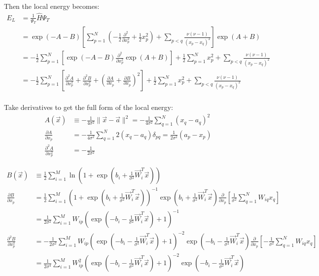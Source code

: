 \documentclass[12pt]{article}
\begin{document}
\noindent Then the local energy becomes:
\begin{align*}
E_L &= \frac{1}{\Psi_T} \hat{H} \Psi_T\\
&= \exp (-A-B)
\left[ \sum_{p=1}^{N} \left( -\frac{1}{2} \frac{\partial^2}{\partial x_p^2} + \frac{1}{2} x_p^2 \right) + \sum_{p<q} \frac{\nu (\nu -1)}{(x_p-x_q)^2} \right]
\exp (A+B)\\
&= -\frac{1}{2} \sum_{p=1}^{N} \left[ \exp (-A-B) \frac{\partial^2}{\partial x_p^2}  \exp(A+B)  \right]
+ \frac{1}{2} \sum_{p=1}^{N} x_p^2 + \sum_{p<q} \frac{\nu (\nu -1)}{(x_p-x_q)^2} \\
&= -\frac{1}{2} \sum_{p=1}^{N} \left[  \frac{\partial^2 A}{\partial x_p^2} + \frac{\partial^2 B}{\partial x_p^2} + \left( \frac{\partial A}{\partial x_p}  + \frac{\partial B}{\partial x_p} \right)^2 \right]
+ \frac{1}{2} \sum_{p=1}^{N} x_p^2 + \sum_{p<q} \frac{\nu (\nu -1)}{(x_p-x_q)^2} \\
\end{align*}

\noindent Take derivatives to get the full form of the local energy:
\begin{align*}
A(\vec{x}) &\equiv -\frac{1}{4\sigma^2} \| \vec{x}-\vec{a} \|^2=  -\frac{1}{4\sigma^2} \sum_{q=1}^N (x_q-a_q)^2\\
\frac{\partial A}{\partial x_p} 
&= -\frac{1}{4\sigma^2} \sum_{q=1}^N 2(x_q-a_q) \delta_{pq} = \frac{1}{2\sigma^2} (a_p-x_p)\\
\frac{\partial^2 A}{\partial x_p^2} 
&= -\frac{1}{2 \sigma^2}
\end{align*}

\begin{align*}
B(\vec{x}) &\equiv \frac{1}{2} \sum_{i=1}^M \ln \left( 1 + \exp \left(b_i + \frac{1}{\sigma^2} \vec{W}_i^T \vec{x} \right) \right)\\
\frac{\partial B}{\partial x_p} 
&= \frac{1}{2} \sum_{i=1}^M \left( 1 + \exp \left(b_i + \frac{1}{\sigma^2} \vec{W}_i^T \vec{x} \right) \right)^{-1}  
\exp \left(b_i + \frac{1}{\sigma^2} \vec{W}_i^T \vec{x} \right)
\frac{\partial}{\partial x_p} \left[ \frac{1}{\sigma^2} \sum_{q=1}^N W_{iq}x_q \right]\\
&= \frac{1}{2\sigma^2} \sum_{i=1}^M W_{ip} \left( \exp \left(-b_i - \frac{1}{\sigma^2} \vec{W}_i^T \vec{x} \right)+1 \right)^{-1}\\
%
\frac{\partial^2 B}{\partial x_p^2} 
&=  -\frac{1}{2\sigma^2} \sum_{i=1}^M W_{ip} \left( \exp \left(-b_i - \frac{1}{\sigma^2} \vec{W}_i^T \vec{x} \right)+1 \right)^{-2} \exp \left(-b_i - \frac{1}{\sigma^2} \vec{W}_i^T \vec{x} \right) 
\frac{\partial}{\partial x_p} \left[ -\frac{1}{\sigma^2} \sum_{q=1}^N W_{iq}x_q \right]\\
&=  \frac{1}{2\sigma^4} \sum_{i=1}^M W_{ip}^2 \left( \exp \left(-b_i - \frac{1}{\sigma^2} \vec{W}_i^T \vec{x} \right)+1 \right)^{-2} \exp \left(-b_i - \frac{1}{\sigma^2} \vec{W}_i^T \vec{x} \right) \\
\end{align*}
\end{document}
